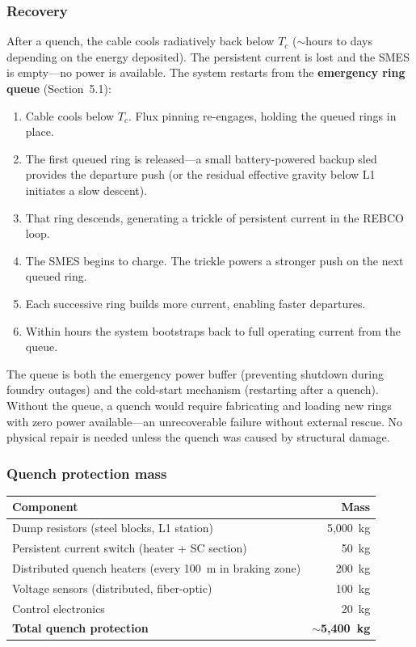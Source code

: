 \documentclass[12pt,letterpaper]{article}
\begin{document}
\subsubsection{Recovery}

After a quench, the cable cools radiatively back below $T_c$ (${\sim}$hours to days depending on the energy deposited). The persistent current is lost and the SMES is empty---no power is available. The system restarts from the \textbf{emergency ring queue} (Section~5.1):

\begin{enumerate}[nosep]
\item Cable cools below $T_c$. Flux pinning re-engages, holding the queued rings in place.
\item The first queued ring is released---a small battery-powered backup sled provides the departure push (or the residual effective gravity below L1 initiates a slow descent).
\item That ring descends, generating a trickle of persistent current in the REBCO loop.
\item The SMES begins to charge. The trickle powers a stronger push on the next queued ring.
\item Each successive ring builds more current, enabling faster departures.
\item Within hours the system bootstraps back to full operating current from the queue.
\end{enumerate}

\noindent The queue is both the emergency power buffer (preventing shutdown during foundry outages) and the cold-start mechanism (restarting after a quench). Without the queue, a quench would require fabricating and loading new rings with zero power available---an unrecoverable failure without external rescue. No physical repair is needed unless the quench was caused by structural damage.

\subsubsection{Quench protection mass}

\begin{center}
\small
\begin{tabular}{lr}
\toprule
\textbf{Component} & \textbf{Mass} \\
\midrule
Dump resistors (steel blocks, L1 station) & 5,000~kg \\
Persistent current switch (heater + SC section) & 50~kg \\
Distributed quench heaters (every 100~m in braking zone) & 200~kg \\
Voltage sensors (distributed, fiber-optic) & 100~kg \\
Control electronics & 20~kg \\
\midrule
\textbf{Total quench protection} & $\sim$\textbf{5,400~kg} \\
\bottomrule
\end{tabular}
\end{center}
\end{document}

